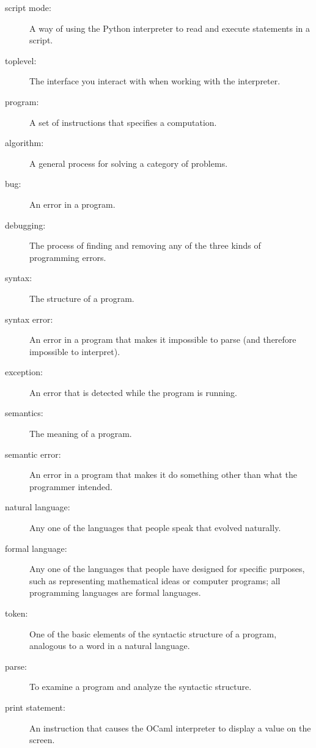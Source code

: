 \documentclass[10pt]{book}
\begin{document}
\begin{description}
\item[script mode:] A way of using the Python interpreter to read and execute statements in a script.

\item[toplevel:] The interface you interact with when working with the interpreter.

\item[program:] A set of instructions that specifies a computation.

\item[algorithm:]  A general process for solving a category of problems.

\item[bug:]  An error in a program.

\item[debugging:]  The process of finding and removing any of the three kinds of programming errors.

\item[syntax:]  The structure of a program.

\item[syntax error:]  An error in a program that makes it impossible to parse (and therefore impossible to interpret).

\item[exception:]  An error that is detected while the program is running.

\item[semantics:]  The meaning of a program.

\item[semantic error:]   An error in a program that makes it do something other than what the programmer intended.

\item[natural language:]  Any one of the languages that people speak that evolved naturally.

\item[formal language:]  Any one of the languages that people have designed for specific purposes, such as representing mathematical ideas or computer programs; all programming languages are formal languages.

\item[token:]  One of the basic elements of the syntactic structure of a program, analogous to a word in a natural language.

\item[parse:]  To examine a program and analyze the syntactic structure.

\item[print statement:]  An instruction that causes the OCaml interpreter to display a value on the screen.


\end{description}
\end{document}
